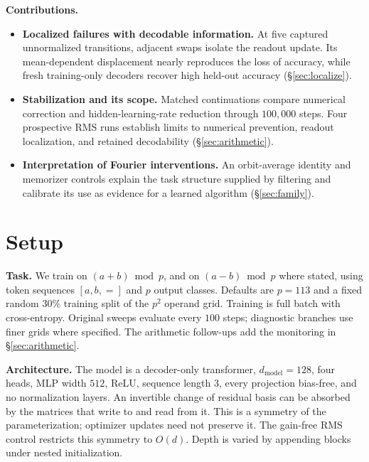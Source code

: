 \documentclass{article}
\begin{document}
\textbf{Contributions.}
\begin{itemize}\itemsep0pt
\item \textbf{Localized failures with decodable information.} At five captured unnormalized transitions, adjacent swaps isolate the readout update. Its mean-dependent displacement nearly reproduces the loss of accuracy, while fresh training-only decoders recover high held-out accuracy (\S\ref{sec:localize}).
\item \textbf{Stabilization and its scope.} Matched continuations compare numerical correction and hidden-learning-rate reduction through $100{,}000$ steps. Four prospective RMS runs establish limits to numerical prevention, readout localization, and retained decodability (\S\ref{sec:arithmetic}).
\item \textbf{Interpretation of Fourier interventions.} An orbit-average identity and memorizer controls explain the task structure supplied by filtering and calibrate its use as evidence for a learned algorithm (\S\ref{sec:family}).
\end{itemize}

\section{Setup}
\label{sec:setup}

\textbf{Task.} We train on $(a+b)\bmod p$, and on $(a-b)\bmod p$ where stated, using token sequences $[a,b,=]$ and $p$ output classes. Defaults are $p=113$ and a fixed random $30\%$ training split of the $p^2$ operand grid. Training is full batch with cross-entropy. Original sweeps evaluate every $100$ steps; diagnostic branches use finer grids where specified. The arithmetic follow-ups add the monitoring in \S\ref{sec:arithmetic}.

\textbf{Architecture.} The model is a decoder-only transformer, $d_{\text{model}}=128$, four heads, MLP width $512$, ReLU, sequence length $3$, every projection bias-free, and no normalization layers. An invertible change of residual basis can be absorbed by the matrices that write to and read from it. This is a symmetry of the parameterization; optimizer updates need not preserve it. The gain-free RMS control restricts this symmetry to $O(d)$. Depth is varied by appending blocks under nested initialization.
\end{document}
